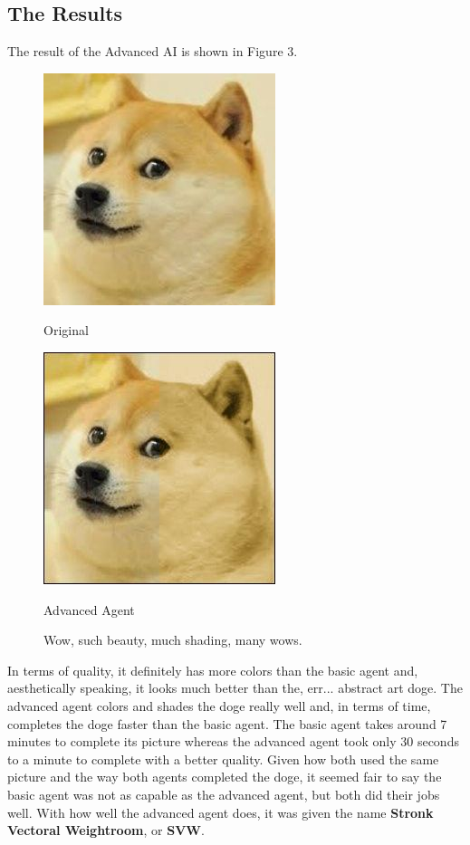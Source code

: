 \documentclass[11pt]{article}
\begin{document}
\subsection{The Results}
The result of the Advanced AI is shown in Figure 3.

\begin{figure}[h]
\begin{minipage}[c]{0.5\textwidth}
\centering
\includegraphics[scale=0.94]{images/smolDoge.jpg}
\begin{center}
Original
\end{center}
\end{minipage}
\begin{minipage}[c]{0.5\textwidth}
\centering
\includegraphics[scale=0.70]{images/advanced.jpg}
\begin{center}
Advanced Agent
\end{center}
\end{minipage}
\caption{Wow, such beauty, much shading, many wows.}
\end{figure}

In terms of quality, it definitely has more colors than the basic agent and, aesthetically speaking, it looks much better than the, err... abstract art doge. The advanced agent colors and shades the doge really well and, in terms of time, completes the doge faster than the basic agent. The basic agent takes around 7 minutes to complete its picture whereas the advanced agent took only 30 seconds to a minute to complete with a better quality. Given how both used the same picture and the way both agents completed the doge, it seemed fair to say the basic agent was not as capable as the advanced agent, but both did their jobs well. With how well the advanced agent does, it was given the name \textbf{Stronk Vectoral Weightroom}, or \textbf{SVW}.
\end{document}
